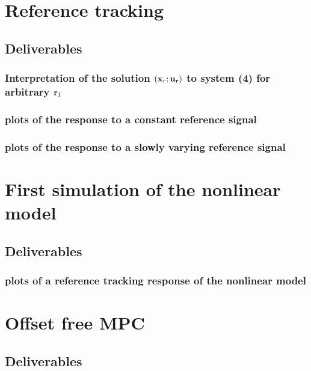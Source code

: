 \documentclass[a4paper]{report}
\begin{document}
\section*{Reference tracking}
\subsection*{Deliverables}
\subsubsection*{Interpretation of the solution $(\bold{x}_r; \bold{u_r})$ to system (4) for arbitrary $\bold{r}_1$}
\subsubsection*{plots of the response to a constant reference signal}
\subsubsection*{plots of the response to a slowly varying reference signal}

\section*{First simulation of the nonlinear model}
\subsection*{Deliverables}
\subsubsection*{plots of a reference tracking response of the nonlinear model}

\section*{Offset free MPC}
\subsection*{Deliverables}
\end{document}
